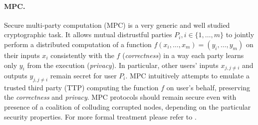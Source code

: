 \documentclass[
  digital, %
  twoside, %
  table,   %
  lof,     %
  lot,     %
]{fithesis3}
\theoremstyle{definition}
\theoremstyle{remark}
\begin{document}
\paragraph{MPC.}%
Secure multi-party computation (MPC) is a very generic and well studied cryptographic task.
It allows mutual distrustful parties $P_i, i \in \{1,\dots,m\}$ to jointly perform a distributed computation of a function $f(x_i,\dots,x_m) = (y_i,\dots,y_m)$ on their inputs $x_i$ consistently with the $f$ (\emph{correctness}) in a way each party learns only $y_i$ from the execution (\emph{privacy}). In particular, other users' inputs $x_{j, j \neq i}$ and outputs $y_{j, j \neq i}$ remain secret for user $P_i$.
MPC intuitively attempts to emulate a trusted third party (TTP) computing the function $f$ on user's behalf, preserving the \emph{correctness} and \emph{privacy}.
MPC protocols should remain secure even with presence of a coalition of colluding corrupted nodes, depending on the particular security properties.
For more formal treatment please refer to \cite{G09}.
\end{document}
